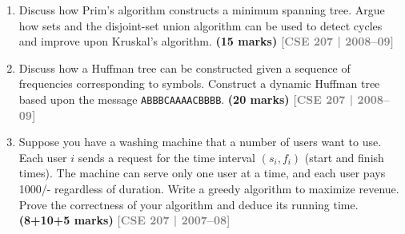 \documentclass[12pt,a3paper]{article}
\newcommand{\yr}[1]{\hfill\textcolor{gray}{\small\textbf{[#1]}}}
\newcommand{\mk}[1]{\textcolor{orange!70!black}{\small\textbf{(#1 marks)}}}
\begin{document}
\begin{enumerate}
\gdef\drawKruskalNodesEight{
  \node[stepnode] (A) at (2, 4)  {A};
  \node[stepnode] (B) at (0, 2)  {B};
  \node[stepnode] (C) at (4, 2)  {C};
  \node[stepnode] (D) at (-2, 0) {D};
  \node[stepnode] (E) at (0, 5)  {E};
  \node[stepnode] (F) at (4, 0)  {F};
  \node[stepnode] (G) at (6, 3)  {G};
  \node[stepnode] (H) at (-2, -2){H};
}

\gdef\drawKruskalFaintEdgesEight{
  \draw[grayedge] (B) -- node[graylbl, below]       {1} (C);
  \draw[grayedge] (A) -- node[graylbl, above left]  {2} (B);
  \draw[grayedge] (C) -- node[graylbl, below right] {2} (G);
  \draw[grayedge] (C) -- node[graylbl, right]       {3} (F);
  \draw[grayedge] (A) -- node[graylbl, above right] {3} (C);
  \draw[grayedge] (F) -- node[graylbl, right]       {4} (G);
  \draw[grayedge] (A) -- node[graylbl, right]       {5} (E);
  \draw[grayedge] (D) -- node[graylbl, left]        {5} (H);
  \draw[grayedge] (B) -- node[graylbl, above left]  {6} (D);
  \draw[grayedge] (D) -- node[graylbl, left]        {7} (E);
  \draw[grayedge] (B) -- node[graylbl, below left, pos=0.8] {9} (F);
}

\item Discuss how Prim's algorithm constructs a minimum spanning tree. Argue how sets and the disjoint-set union algorithm can be used to detect cycles and improve upon Kruskal's algorithm. \mk{15}
\yr{CSE 207 | 2008--09}

\item Discuss how a Huffman tree can be constructed given a sequence of frequencies corresponding to symbols. Construct a dynamic Huffman tree based upon the message \texttt{ABBBCAAAACBBBB}. \mk{20}
\yr{CSE 207 | 2008--09}

\item Suppose you have a washing machine that a number of users want to use. Each user $i$ sends a request for the time interval $(s_i, f_i)$ (start and finish times). The machine can serve only one user at a time, and each user pays 1000/- regardless of duration. Write a greedy algorithm to maximize revenue. Prove the correctness of your algorithm and deduce its running time. \mk{8+10+5}
\yr{CSE 207 | 2007--08}


\end{enumerate}
\end{document}
